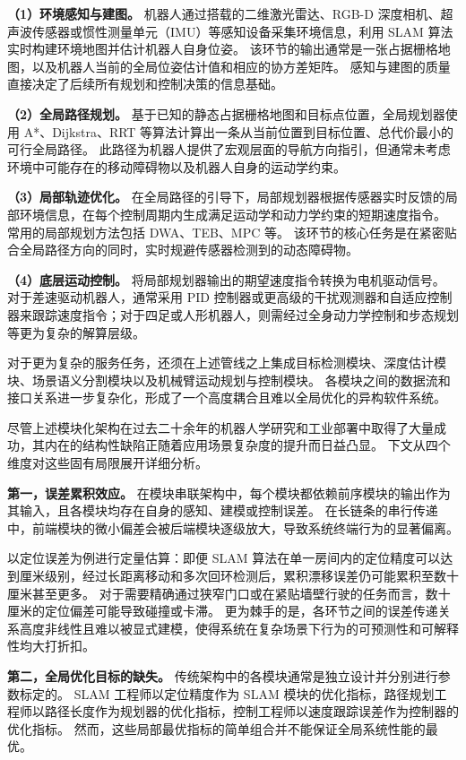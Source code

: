 \documentclass[12pt,a4paper]{ctexart}
\begin{document}
\textbf{（1）环境感知与建图。} 机器人通过搭载的二维激光雷达、RGB-D 深度相机、超声波传感器或惯性测量单元（IMU）等感知设备采集环境信息，利用 SLAM 算法实时构建环境地图并估计机器人自身位姿。
该环节的输出通常是一张占据栅格地图，以及机器人当前的全局位姿估计值和相应的协方差矩阵。
感知与建图的质量直接决定了后续所有规划和控制决策的信息基础。

\textbf{（2）全局路径规划。} 基于已知的静态占据栅格地图和目标点位置，全局规划器使用 A*、Dijkstra、RRT 等算法计算出一条从当前位置到目标位置、总代价最小的可行全局路径。
此路径为机器人提供了宏观层面的导航方向指引，但通常未考虑环境中可能存在的移动障碍物以及机器人自身的运动学约束。

\textbf{（3）局部轨迹优化。} 在全局路径的引导下，局部规划器根据传感器实时反馈的局部环境信息，在每个控制周期内生成满足运动学和动力学约束的短期速度指令。
常用的局部规划方法包括 DWA、TEB、MPC 等。
该环节的核心任务是在紧密贴合全局路径方向的同时，实时规避传感器检测到的动态障碍物。

\textbf{（4）底层运动控制。} 将局部规划器输出的期望速度指令转换为电机驱动信号。
对于差速驱动机器人，通常采用 PID 控制器或更高级的干扰观测器和自适应控制器来跟踪速度指令；对于四足或人形机器人，则需经过全身动力学控制和步态规划等更为复杂的解算层级。

对于更为复杂的服务任务，还须在上述管线之上集成目标检测模块、深度估计模块、场景语义分割模块以及机械臂运动规划与控制模块。
各模块之间的数据流和接口关系进一步复杂化，形成了一个高度耦合且难以全局优化的异构软件系统。

尽管上述模块化架构在过去二十余年的机器人学研究和工业部署中取得了大量成功，其内在的结构性缺陷正随着应用场景复杂度的提升而日益凸显。
下文从四个维度对这些固有局限展开详细分析。

\textbf{第一，误差累积效应。}
在模块串联架构中，每个模块都依赖前序模块的输出作为其输入，且各模块均存在自身的感知、建模或控制误差。
在长链条的串行传递中，前端模块的微小偏差会被后端模块逐级放大，导致系统终端行为的显著偏离。

以定位误差为例进行定量估算：即便 SLAM 算法在单一房间内的定位精度可以达到厘米级别，经过长距离移动和多次回环检测后，累积漂移误差仍可能累积至数十厘米甚至更多。
对于需要精确通过狭窄门口或在紧贴墙壁行驶的任务而言，数十厘米的定位偏差可能导致碰撞或卡滞。
更为棘手的是，各环节之间的误差传递关系高度非线性且难以被显式建模，使得系统在复杂场景下行为的可预测性和可解释性均大打折扣。

\textbf{第二，全局优化目标的缺失。}
传统架构中的各模块通常是独立设计并分别进行参数标定的。
SLAM 工程师以定位精度作为 SLAM 模块的优化指标，路径规划工程师以路径长度作为规划器的优化指标，控制工程师以速度跟踪误差作为控制器的优化指标。
然而，这些局部最优指标的简单组合并不能保证全局系统性能的最优。
\end{document}

